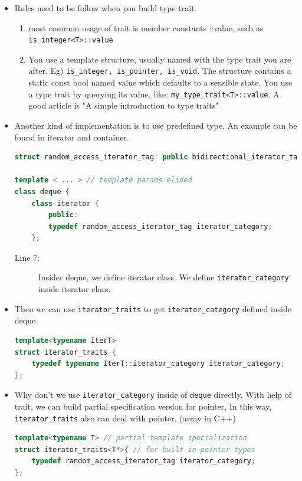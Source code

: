 \documentclass[a4paper,11pt,twoside]{book}
\begin{document}
\begin{itemize}
	\item Rules need to be follow when you build type trait.
	
	\begin{enumerate}
		\item most common usage of trait is member constants ::value, such as \texttt{is\_integer<T>::value}
		
		\item You use a template structure, usually named with the type trait you are after. Eg) \texttt{is\_integer, is\_pointer, is\_void}. The structure contains a static const bool named value which defaults to a sensible state. You use a type trait by querying its value, like: \texttt{my\_type\_trait<T>::value}. A good article is "A simple introduction to type traits"
	\end{enumerate}

	\item Another kind of implementation is to use predefined type. An example can be found in iterator and container.

\begin{lstlisting}[frame=single, language=c++]
struct random_access_iterator_tag: public bidirectional_iterator_tag {};

template < ... > // template params elided
class deque {
	class iterator {
		public:
		typedef random_access_iterator_tag iterator_category;
	};		
\end{lstlisting}
\begin{description}
	\item[Line 7:] Insider deque, we define iterator class. We define \texttt{iterator\_category} inside iterator class. 
\end{description}

	\item Then we can use \texttt{iterator\_traits} to get \texttt{iterator\_category} defined inside deque.
\begin{lstlisting}[frame=single, language=c++]
template<typename IterT>
struct iterator_traits {
	typedef typename IterT::iterator_category iterator_category;
};
\end{lstlisting}

	\item Why don't we use \texttt{iterator\_category} inside of \texttt{deque} directly. With help of trait, we can build partial specification version for pointer, In this way, \texttt{iterator\_traits} also can deal with pointer. (array in C++)
\begin{lstlisting}[frame=single, language=c++]
template<typename T> // partial template specialization
struct iterator_traits<T*>{ // for built-in pointer types
	typedef random_access_iterator_tag iterator_category;
};
\end{lstlisting}


\end{itemize}
\end{document}
